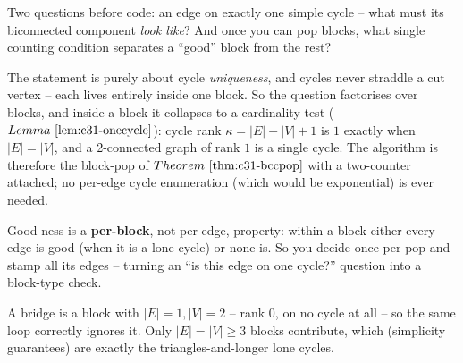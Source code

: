 \begin{attemptgate}
Two questions before code: an edge on exactly one simple cycle -- what must its
biconnected component \emph{look like}?  And once you can pop blocks, what single
counting condition separates a ``good'' block from the rest?
\end{attemptgate}

The statement is purely about cycle \emph{uniqueness}, and cycles never straddle a cut
vertex -- each lives entirely inside one block.  So the question factorises over blocks,
and inside a block it collapses to a cardinality test (\(\lemref{c31-onecycle}\)): cycle
rank \(\kappa=|E|-|V|+1\) is \(1\) exactly when \(|E|=|V|\), and a 2-connected graph of
rank \(1\) is a single cycle.  The algorithm is therefore the block-pop of
\(\thmref{c31-bccpop}\) with a two-counter attached; no per-edge cycle enumeration (which
would be exponential) is ever needed.

\begin{observation}
Good-ness is a \textbf{per-block}, not per-edge, property: within a block either every
edge is good (when it is a lone cycle) or none is.  So you decide once per pop and stamp
all its edges -- turning an ``is this edge on one cycle?'' question into a block-type check.
\end{observation}
\begin{observation}
A bridge is a block with \(|E|=1,|V|=2\) -- rank \(0\), on no cycle at all -- so the same
loop correctly ignores it.  Only \(|E|=|V|\ge3\) blocks contribute, which (simplicity
guarantees) are exactly the triangles-and-longer lone cycles.
\end{observation}

